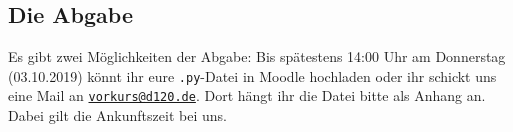 \documentclass[accentcolor=3c,colorbacktitle,12pt]{tudaexercise}
\begin{document}
	\subsection*{Die Abgabe} 
	Es gibt zwei Möglichkeiten der Abgabe: Bis spätestens 14:00 Uhr am Donnerstag (03.10.2019) könnt ihr eure \texttt{.py}-Datei in Moodle hochladen oder ihr schickt uns eine Mail an \href{mailto:vorkurs@d120.de}{\nolinkurl{vorkurs@d120.de}}. Dort hängt ihr die Datei bitte als Anhang an. Dabei gilt die Ankunftszeit bei uns.
\end{document}
